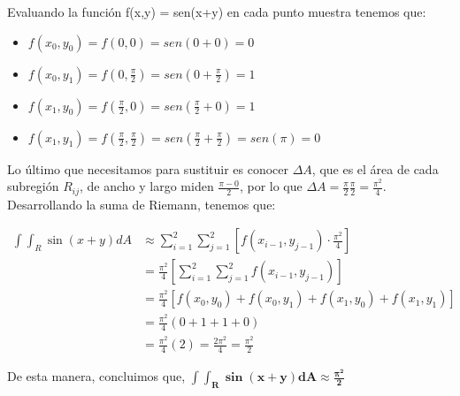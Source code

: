 \documentclass[12pt]{exam}
\begin{document}
\begin{questions}
Evaluando la función f(x,y) = sen(x+y) en cada punto muestra tenemos que:
\begin{itemize}
\item $f(x_0, y_0)= f(0,0) = sen(0+0) = 0$\\
\item $f(x_0,y_1) = f(0,\frac{\pi}{2}) = sen(0+\frac{\pi}{2}) = 1$\\
  \item $f(x_1, y_0) = f(\frac{\pi}{2},0) = sen(\frac{\pi}{2}+0) = 1$\\
\item $f(x_1, y_1) =  f(\frac{\pi}{2},\frac{\pi}{2}) = sen(\frac{\pi}{2}+\frac{\pi}{2}) = sen(\pi)= 0$\\
\end{itemize}
Lo último que necesitamos para sustituir es conocer $\Delta A$, que es el área de cada subregión $R_{ij}$, de ancho y largo miden $\frac{\pi-0}{2}$, por lo que $\Delta A =  \frac{\pi}{2}\frac{\pi}{2} = \frac{\pi^{2}}{4}$.\\
Desarrollando la suma de Riemann, tenemos que:

  \begin{align*}
    \int \int _R \sin{(x+y)} dA 
    &\approx \sum_{i=1}^{2}\sum_{j=1}^{2} \left[ f(x_{i-1},y_{j-1}) \cdot  \frac{\pi^2}{4} \right] \\
    &= \frac{\pi^2}{4} \left[ \sum_{i=1}^{2}\sum_{j=1}^{2} f(x_{i-1},y_{j-1}) \right] \\
    &= \frac{\pi^2}{4} \left[f(x_0,y_0)+f\left(x_0,y_1\right)+f\left(x_1,y_0\right)+f\left(x_1,y_1\right) \right] \\
    &= \frac{\pi^2}{4} \left(0+1+1+0 \right) \\
    &= \frac{\pi^2}{4}  \left(2 \right) = \frac{2\pi^2}{4}= \frac{\pi^2}{2} 
  \end{align*}

De esta manera, concluimos que, $\boldsymbol{\int \int _R \sin{(x+y)} dA \approx \frac{\pi^2}{2}}$


\end{questions}
\end{document}
